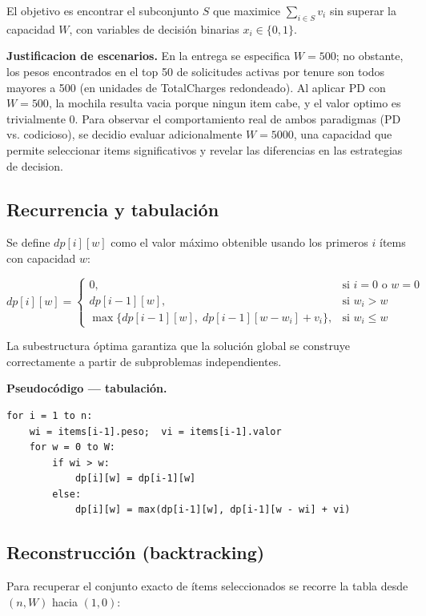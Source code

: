 \documentclass[12pt, a4paper]{article}
\begin{document}
El objetivo es encontrar el subconjunto $S$ que maximice $\sum_{i \in S} v_i$ sin superar la capacidad $W$, con variables de decisión binarias $x_i \in \{0, 1\}$. 

\item \textbf{Justificacion de escenarios.} En la entrega se especifica $W=500$; no obstante, los pesos encontrados en el top 50 de solicitudes activas por tenure son todos mayores a 500 (en unidades de TotalCharges redondeado). Al aplicar PD con $W=500$, la mochila resulta vacia porque ningun item cabe, y el valor optimo es trivialmente 0. Para observar el comportamiento real de ambos paradigmas (PD vs. codicioso), se decidio evaluar adicionalmente $W=5000$, una capacidad que permite seleccionar items significativos y revelar las diferencias en las estrategias de decision.

\subsection{Recurrencia y tabulación}

Se define $dp[i][w]$ como el valor máximo obtenible usando los primeros $i$ ítems con capacidad $w$:

\[
dp[i][w] =
\begin{cases}
  0, & \text{si } i = 0 \text{ o } w = 0 \\[3pt]
  dp[i-1][w], & \text{si } w_i > w \\[3pt]
  \max\!\bigl\{dp[i-1][w],\; dp[i-1][w - w_i] + v_i\bigr\}, & \text{si } w_i \leq w
\end{cases}
\]

La subestructura óptima garantiza que la solución global se construye correctamente a partir de subproblemas independientes.


\textbf{Pseudocódigo — tabulación.}
\begin{lstlisting}
for i = 1 to n:
    wi = items[i-1].peso;  vi = items[i-1].valor
    for w = 0 to W:
        if wi > w:
            dp[i][w] = dp[i-1][w]
        else:
            dp[i][w] = max(dp[i-1][w], dp[i-1][w - wi] + vi)
\end{lstlisting}

\subsection{Reconstrucción (backtracking)}

Para recuperar el conjunto exacto de ítems seleccionados se recorre la tabla desde $(n, W)$ hacia $(1, 0)$:
\end{document}
